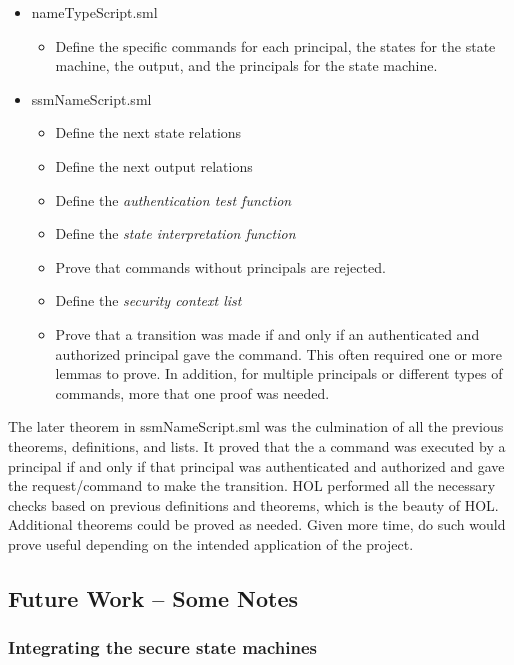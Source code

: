\begin{itemize}
\item nameTypeScript.sml
  \begin{itemize}
  \item Define the specific commands for each principal, the states for the state machine,
    the output, and the principals for the state machine.
  \end{itemize}
\item ssmNameScript.sml
  \begin{itemize}
  \item Define the next state relations
  \item Define the next output relations
  \item Define the \textit{authentication test function}
  \item Define the \textit{state interpretation function}
  \item Prove that commands without principals are rejected.
  \item Define the \textit{security context list}
  \item Prove that a transition was made if and only if an authenticated and authorized
    principal gave the command. This often required one or more lemmas to prove. In addition,
    for multiple principals or different types of commands, more that one proof was needed.
    \end{itemize}
\end{itemize}

The later theorem in ssmNameScript.sml was the culmination of all the previous theorems,
definitions, and lists. It proved that the a command was executed by a principal if and
only if that principal was authenticated and authorized and gave the request/command to
make the transition. HOL performed all the necessary checks based on previous definitions
and theorems, which is the beauty of HOL. Additional theorems could be proved as needed.
Given more time, do such would prove useful depending on the intended application of the project.

\subsection{Future Work -- Some Notes}
\label{sec:future-work-some-1}

\subsubsection{Integrating the secure state machines}
\label{sec:integr-secure-state}

